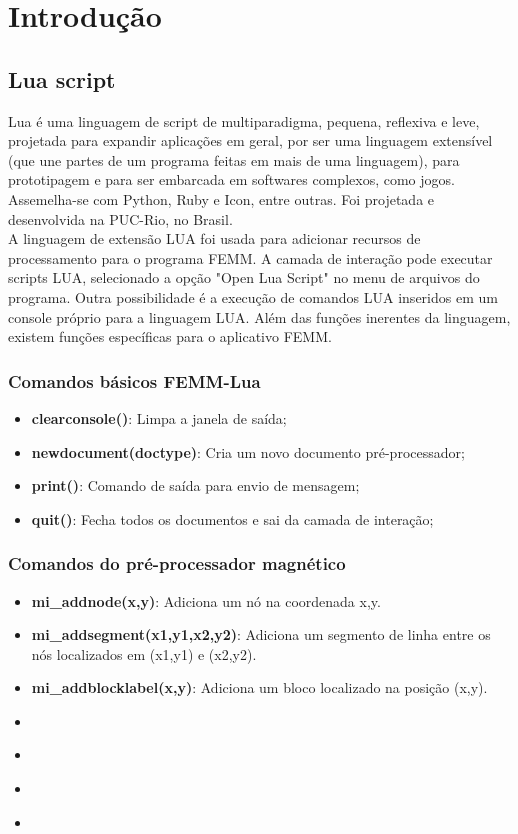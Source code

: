 \section{Introdução}
\label{cap2:introducao}
\subsection{Lua script}
Lua é uma linguagem de script de multiparadigma, pequena, reflexiva e leve, projetada para expandir aplicações em geral, por ser uma linguagem extensível (que une partes de um programa feitas em mais de uma linguagem), para prototipagem e para ser embarcada em softwares complexos, como jogos. Assemelha-se com Python, Ruby e Icon, entre outras. Foi projetada e desenvolvida na PUC-Rio, no Brasil.\\
A linguagem de extensão LUA foi usada para adicionar recursos de processamento para o programa FEMM. A camada de interação pode executar scripts LUA, selecionado a opção "Open Lua Script" no menu de arquivos do programa. Outra possibilidade é a execução de comandos LUA inseridos em um console próprio para a linguagem LUA. Além das funções inerentes da linguagem, existem funções específicas para o aplicativo FEMM.
\subsubsection{Comandos básicos FEMM-Lua}
\begin{itemize}
  \item \textbf{clearconsole()}: Limpa a janela de saída;
  \item \textbf{newdocument(doctype)}: Cria um novo documento pré-processador;
  \item \textbf{print()}: Comando de saída para envio de mensagem;
  \item \textbf{quit()}: Fecha todos os documentos e sai da camada de interação;
\end{itemize}

\subsubsection{Comandos do pré-processador magnético}
\begin{itemize}
  \item \textbf{mi_addnode(x,y)}: Adiciona um nó na coordenada x,y.
  \item \textbf{mi_addsegment(x1,y1,x2,y2)}: Adiciona um segmento de linha entre os nós localizados em (x1,y1) e (x2,y2).
  \item \textbf{mi_addblocklabel(x,y)}: Adiciona um bloco localizado na posição (x,y).
  \item \textbf{}
  \item \textbf{}
  \item \textbf{}
  \item \textbf{}
\end{itemize}
